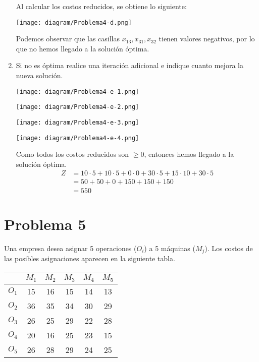 \documentclass{templateNote}
\begin{document}
\begin{enumerate}
    Al calcular los costos reducidos, se obtiene lo siguiente:
    \begin{center}
        \texttt{[image: diagram/Problema4-d.png]}
    \end{center}

    Podemos observar que las casillas $x_{13}, x_{31}, x_{32}$ tienen valores negativos, por lo que no hemos llegado a la soluci\'on \'optima.

    \item Si no es \'optima realice una iteraci\'on adicional e indique cuanto mejora la nueva soluci\'on.
    \begin{center}
        \texttt{[image: diagram/Problema4-e-1.png]}
    \end{center}
    \begin{center}
        \texttt{[image: diagram/Problema4-e-2.png]}
    \end{center}
    \begin{center}
        \texttt{[image: diagram/Problema4-e-3.png]}
    \end{center}
    \begin{center}
        \texttt{[image: diagram/Problema4-e-4.png]}
    \end{center}

    Como todos los costos reducidos son $\geq 0$, entonces hemos llegado a la soluci\'on \'optima.
    \begin{align*}
        Z &= 10 \cdot 5 + 10 \cdot 5 + 0 \cdot 0 + 30 \cdot 5 + 15 \cdot 10 + 30 \cdot 5 \\
        &= 50 + 50 + 0 + 150 + 150 + 150 \\
        &= 550
    \end{align*}
\end{enumerate}

\newpage
\section*{Problema 5}
Una empresa desea asignar 5 operaciones ($O_i$) a 5 m\'aquinas ($M_j$). Los costos de las posibles asignaciones aparecen en la siguiente tabla.
\begin{center}
    \begin{tabular}{|c|ccccc|}
        \hline
        & $M_1$ & $M_2$ & $M_3$ & $M_4$ & $M_5$ \\ \hline
        $O_1$ & 15 & 16 & \cellcolor{orange}15 & 14 & 13 \\
        $O_2$ & 36 & 35 & 34 & 30 & \cellcolor{orange}29 \\
        $O_3$ & 26 & 25 & 29 & \cellcolor{orange}22 & 28 \\
        $O_4$ & 20 & \cellcolor{orange}16 & 25 & 23 & 15 \\
        $O_5$ & \cellcolor{orange}26 & 28 & 29 & 24 & 25 \\ \hline
    \end{tabular}
\end{center}
\end{document}
